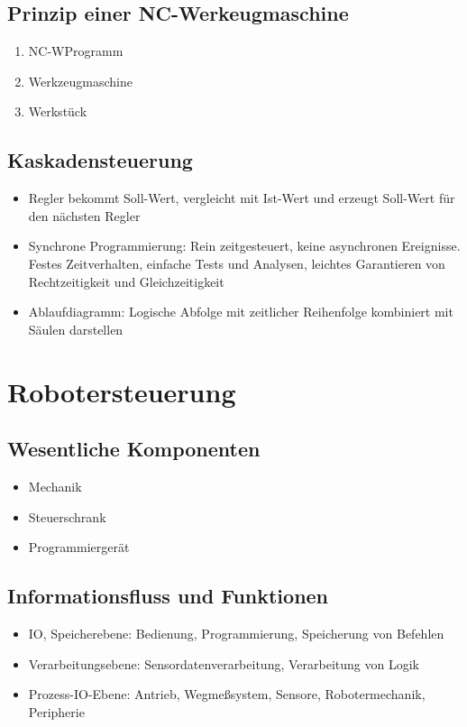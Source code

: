 \subsection{Prinzip einer NC-Werkeugmaschine}
\begin{enumerate}
	\item NC-WProgramm
	\item Werkzeugmaschine
	\item Werkstück
\end{enumerate}

\subsection{Kaskadensteuerung}
\begin{itemize}
	\item Regler bekommt Soll-Wert, vergleicht mit Ist-Wert und erzeugt Soll-Wert für den nächsten Regler
	\item Synchrone Programmierung: Rein zeitgesteuert, keine asynchronen Ereignisse. Festes Zeitverhalten, einfache Tests und Analysen, leichtes Garantieren von Rechtzeitigkeit und Gleichzeitigkeit
	\item Ablaufdiagramm: Logische Abfolge mit zeitlicher Reihenfolge kombiniert mit Säulen darstellen
\end{itemize}



\section{Robotersteuerung}

\subsection{Wesentliche Komponenten}
\begin{itemize}
	\item Mechanik
	\item Steuerschrank
	\item Programmiergerät
\end{itemize}


\subsection{Informationsfluss und Funktionen}
\begin{itemize}
	\item IO, Speicherebene: Bedienung, Programmierung, Speicherung von Befehlen
	\item Verarbeitungsebene: Sensordatenverarbeitung, Verarbeitung von Logik
	\item Prozess-IO-Ebene: Antrieb, Wegmeßsystem, Sensore, Robotermechanik, Peripherie
\end{itemize}


